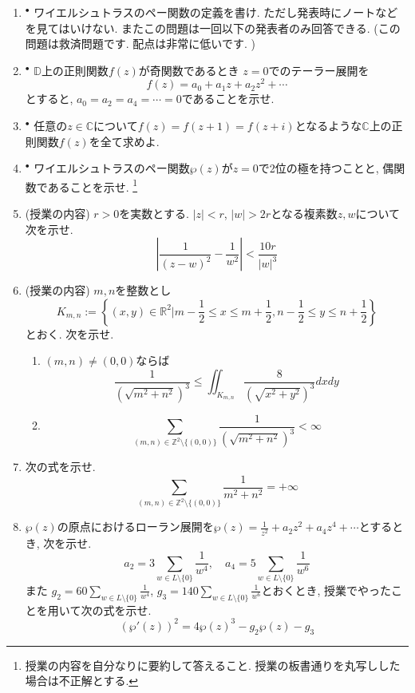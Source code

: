 \documentclass[dvipdfmx,a4paper,11pt]{article}
\newcommand{\R}{\mathbb{R}}
\newcommand{\Z}{\mathbb{Z}}
\newcommand{\C}{\mathbb{C}}
\newcommand{\D}{\mathbb{D}}
\theoremstyle{definition}
\begin{document}
\begin{enumerate}[label=\textbf{問}5.\arabic*]

\item $^{\bullet}$  ワイエルシュトラスのペー関数の定義を書け. ただし発表時にノートなどを見てはいけない. またこの問題は一回以下の発表者のみ回答できる. (この問題は救済問題です. 配点は非常に低いです. )

 \item$^{\bullet}$ $\D$上の正則関数$f(z)$が奇関数であるとき
 $z=0$でのテーラー展開を
 $$
 f(z) = a_0 + a_1 z + a_2 z^2 + \cdots
 $$
 とすると, $a_0=a_2=a_4= \cdots =0$であることを示せ.
 
 \item $^{\bullet}$  任意の$z \in \C$について$f(z)=f(z+1)=f(z+i)$となるような$\C$上の正則関数$f(z)$を全て求めよ. 
 \item $^{\bullet}$ ワイエルシュトラスのペー関数$\wp(z)$が$z=0$で2位の極を持つことと, 偶関数であることを示せ.  \footnote{授業の内容を自分なりに要約して答えること. 授業の板書通りを丸写しした場合は不正解とする. }
 
 \item (授業の内容) $r>0$を実数とする. $|z| < r$, $|w| > 2r$となる複素数$z, w$について次を示せ.
 $$\left|\frac{1}{(z - w)^2} - \frac{1}{w^2} \right| < \frac{10 r }{|w|^3}$$

 
 \item (授業の内容) $m,n$を整数とし
 $$
 K_{m,n}:= \left\{ (x,y) \in \R^2 | m - \frac{1}{2} \le x \le m +\frac{1}{2} , n- \frac{1}{2} \le y\le n +\frac{1}{2} \right\}
$$
とおく. 次を示せ.
  \begin{enumerate}
\setlength{\parskip}{0cm} 
  \setlength{\itemsep}{0cm} 
  \item $(m,n) \neq (0,0)$ならば
  $$ \frac{1}{(\sqrt{m^2 + n^2})^3} \le \iint_{K_{m,n}} \frac{8}{(\sqrt{x^2 + y^2})^3} dxdy$$
  \item $$\sum_{(m,n) \in  \Z^2 \setminus \{ (0,0) \}}\frac{1}{(\sqrt{m^2 + n^2})^3} < \infty$$
    \end{enumerate}  
\item 次の式を示せ.
$$\sum_{(m,n) \in  \Z^2 \setminus \{ (0,0) \}}\frac{1}{m^2 + n^2} = +\infty$$

 \item 
$\wp(z)$の原点におけるローラン展開を$\wp(z) = \frac{1}{z^2} + a_2 z^2 + a_4 z^4 + \cdots$とするとき, 次を示せ.
 $$
 a_2 = 3 \sum_{w \in L \setminus \{ 0\}}\frac{1}{w^4}, \quad
 a_4 = 5 \sum_{w \in L \setminus \{ 0\}}\frac{1}{w^6}
 $$
 また
 $g_2 = 60\sum_{w \in L \setminus \{ 0\}}\frac{1}{w^4}$,
 $g_3=140 \sum_{w \in L \setminus \{ 0\}}\frac{1}{w^6}$とおくとき, 授業でやったことを用いて次の式を示せ.
 $$
 (\wp'(z))^2 = 4 \wp(z)^3 - g_2 \wp (z) - g_3
 $$
 

\end{enumerate}
\end{document}
